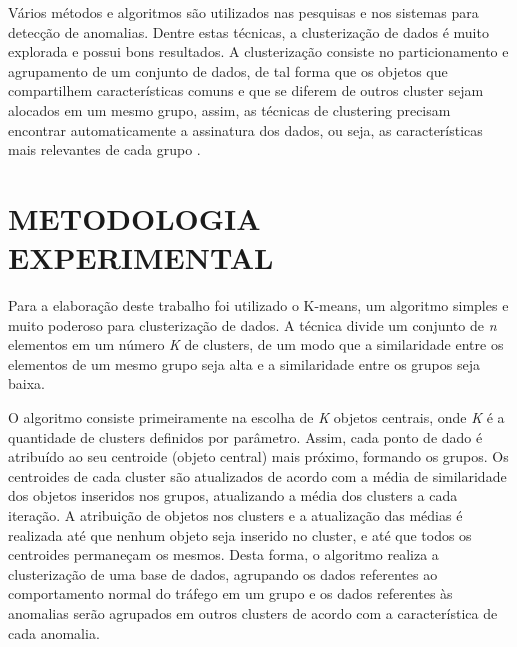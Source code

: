 \documentclass[article,12pt,oneside,a4paper,english,brazil]{unifil}
\begin{document}
\begin{Spacing}{1.5}
Vários métodos e algoritmos são utilizados nas pesquisas e nos sistemas para detecção de anomalias. Dentre estas técnicas, a clusterização de dados é muito explorada e possui bons resultados. A clusterização consiste no particionamento e agrupamento de um conjunto de dados, de tal forma que os objetos que compartilhem características comuns e que se diferem de outros cluster sejam alocados em um mesmo grupo, assim, as técnicas de clustering precisam encontrar automaticamente a assinatura dos dados, ou seja, as características mais relevantes de cada grupo \cite{rehman2009}.

\section*{METODOLOGIA EXPERIMENTAL}

Para a elaboração deste trabalho foi utilizado o  K-means, um algoritmo simples e muito poderoso para clusterização de dados. A técnica divide um conjunto de \textit{n} elementos em um número \textit{K} de clusters, de um modo que a similaridade entre os elementos de um mesmo grupo seja alta e a similaridade entre os grupos seja baixa.

O algoritmo consiste primeiramente na escolha de \textit{K} objetos centrais, onde \textit{K}\textit{} é a quantidade de clusters definidos por parâmetro. Assim, cada ponto de dado é atribuído ao seu centroide (objeto central) mais próximo, formando os grupos. Os centroides de cada cluster são atualizados de acordo com a média de similaridade dos objetos inseridos nos grupos, atualizando a média dos clusters a cada iteração. A atribuição de objetos nos clusters e a atualização das médias é realizada até que nenhum objeto seja inserido no cluster, e até que todos os centroides permaneçam os mesmos. Desta forma, o algoritmo realiza a clusterização de uma base de dados, agrupando os dados referentes ao comportamento normal do tráfego em um grupo e os dados referentes às anomalias serão agrupados em outros clusters de acordo com a característica de cada anomalia.


\end{Spacing}
\postextual

{}
\end{document}
